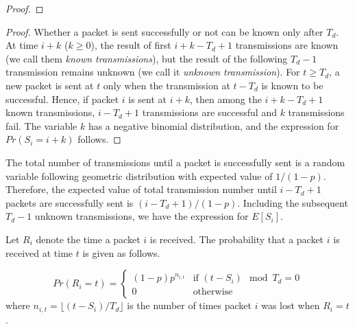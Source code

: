 \begin{proof}
    \end{proof}
\else
    
    \begin{proof}
    Whether a packet is sent successfully or not can be known only after $T_{d}$.  
    At time $i + k$ ($k \geq 0$),  the result of first $i + k - T_d + 1$ transmissions are
    known (we call them \textit{known transmissions}), but the result of the following $T_d - 1$
    transmission remains unknown (we call it \textit{unknown transmission}).  For $t \geq T_d$,
    a new packet is sent at $t$ only when the
    transmission at $t-T_d$ is known to be successful.  Hence, if packet $i$ is sent at
    $i+k$, then among the $i + k - T_d + 1$ known transmissions, $i - T_d + 1$
    transmissions are successful and $k$ transmissions fail.
    The variable $k$ has a negative binomial distribution,
    and the expression for $Pr(S_i = i+k)$ follows.
    \end{proof}

    The total number of transmissions until a packet is successfully sent is
    a random variable following geometric distribution with expected value of
    $1/(1-p)$. Therefore, the expected value of total transmission number
    until $i - T_d + 1$ packets are successfully sent is $(i-T_d+1)/(1-p)$.
    Including the subsequent $T_d - 1$ unknown transmissions, we have the expression
    for $E[S_i]$.  \QED
\fi

    
Let $R_i$ denote the time a packet $i$ is received.
The probability that a packet $i$ is received at time $t$
is given as follows.
\begin{lemma}
\label{l:model:preqt}
  \begin{equation*}
    Pr(R_i = t) = \left\{
   \begin{array}{ll}
    (1-p)p^{n_{i,t}} & \mbox{if } (t-S_i) \mod T_d = 0  \\
        0                & \mbox{otherwise}
   \end{array}
   \right.
\end{equation*}
    where $n_{i,t}=\lfloor(t - S_i)/T_d\rfloor$ is the number of times packet $i$ was lost when $R_i = t$.
\end{lemma}

